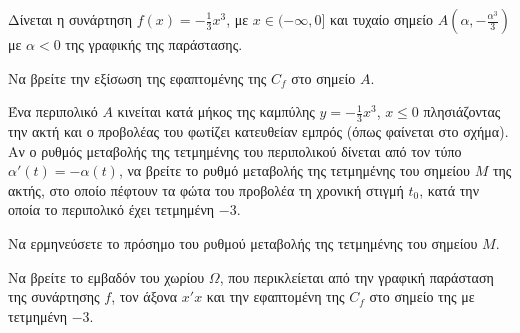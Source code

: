 \begin{figure}
\end{figure}

Δίνεται η συνάρτηση $f(x) = -\frac{1}{3}x^3$, με $x \in (-\infty, 0]$ και τυχαίο σημείο $A\left(\alpha, -\frac{\alpha^3}{3}\right)$ με $\alpha < 0$ της γραφικής της παράστασης.

\begin{alist}
\item Να βρείτε την εξίσωση της εφαπτομένης της $C_f$ στο σημείο $A$. 
\item
    \begin{rlist}
    \item Ένα περιπολικό $A$ κινείται κατά μήκος της καμπύλης $y = -\frac{1}{3}x^3$, $x \le 0$ πλησιάζοντας την ακτή και ο προβολέας του φωτίζει κατευθείαν εμπρός (όπως φαίνεται στο σχήμα). Αν ο ρυθμός μεταβολής της τετμημένης του περιπολικού δίνεται από τον τύπο $\alpha'(t) = -\alpha(t)$, να βρείτε το ρυθμό μεταβολής της τετμημένης του σημείου $M$ της ακτής, στο οποίο πέφτουν τα φώτα του προβολέα τη χρονική στιγμή $t_0$, κατά την οποία το περιπολικό έχει τετμημένη $-3$. 
    \item Να ερμηνεύσετε το πρόσημο του ρυθμού μεταβολής της τετμημένης του σημείου $M$. 
    \end{rlist}
\item Να βρείτε το εμβαδόν του χωρίου $\Omega$, που περικλείεται από την γραφική παράσταση της συνάρτησης $f$, τον άξονα $x'x$ και την εφαπτομένη της $C_f$ στο σημείο της με τετμημένη $-3$. 
\end{alist}